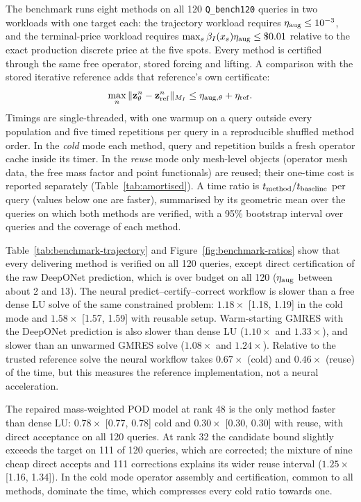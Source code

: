 \documentclass[11pt]{amsart}
\theoremstyle{remark}
\newcommand{\zz}{\mathbf z}
\begin{document}
The benchmark runs eight methods on all 120 \texttt{Q\_bench120} queries
in two workloads with one target each: the trajectory workload requires
$\eta_{\rm aug}\le10^{-3}$, and the terminal-price workload requires
$\max_s\beta_I(x_s)\eta_{\rm aug}\le\$0.01$ relative to the exact production
discrete price at the five spots. Every method is certified through the same
free operator, stored forcing and lifting. A comparison with the stored
iterative reference adds that reference's own certificate:
\begin{equation}
 \max_n\|\zz_\theta^n-\zz_{\rm ref}^n\|_{M_I}
 \le \eta_{{\rm aug},\theta}+\eta_{\rm ref}.
 \label{eq:reference-solve-allowance}
\end{equation}
Timings are single-threaded, with one warmup on a query outside every
population and five timed repetitions per query in a reproducible shuffled
method order. In the \emph{cold} mode each method, query and repetition
builds a fresh operator cache inside its timer. In the \emph{reuse} mode
only mesh-level objects (operator mesh data, the free mass factor and
point functionals) are reused; their one-time cost is reported separately
(Table~\ref{tab:amortised}). A time ratio is
$t_{\rm method}/t_{\rm baseline}$ per query (values below one are faster),
summarised by its geometric mean over the queries on which both methods are
verified, with a 95\% bootstrap interval over queries and the coverage of
each method.



Table~\ref{tab:benchmark-trajectory} and Figure~\ref{fig:benchmark-ratios}
show that every delivering method is verified on all 120 queries, except
direct certification of the raw DeepONet prediction, which is over budget
on all 120 ($\eta_{\rm aug}$ between about 2 and 13). The neural
predict--certify--correct workflow is slower than a free dense LU solve of
the same constrained problem: $1.18\times$ [1.18, 1.19] in the cold mode and
$1.58\times$ [1.57, 1.59] with reusable setup. Warm-starting GMRES with the
DeepONet prediction is also slower than dense LU ($1.10\times$ and
$1.33\times$), and slower than an unwarmed GMRES solve ($1.08\times$ and
$1.24\times$). Relative to
the trusted reference solve the neural workflow takes $0.67\times$ (cold)
and $0.46\times$ (reuse) of the time, but this measures the reference
implementation, not a neural acceleration.

The repaired mass-weighted POD model at rank 48 is the only method faster
than dense LU: $0.78\times$ [0.77, 0.78] cold and $0.30\times$ [0.30, 0.30]
with reuse, with direct acceptance on all 120 queries. At rank 32 the
candidate bound slightly exceeds the target on 111 of 120 queries, which
are corrected; the mixture of nine cheap direct accepts and 111 corrections
explains its wider reuse interval ($1.25\times$ [1.16, 1.34]). In the cold
mode operator assembly and certification, common to all methods, dominate
the time, which compresses every cold ratio towards one.
\end{document}
